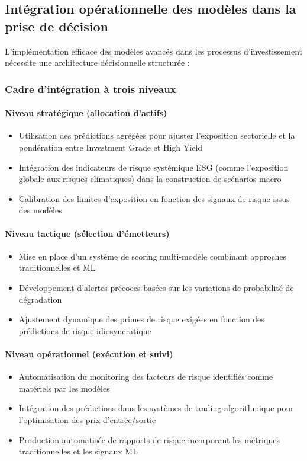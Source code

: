 \subsection{Intégration opérationnelle des modèles dans la prise de décision}

L'implémentation efficace des modèles avancés dans les processus d'investissement nécessite une architecture décisionnelle structurée :

\subsubsection{Cadre d'intégration à trois niveaux}

\paragraph{Niveau stratégique (allocation d'actifs)}
\begin{itemize}
  \item Utilisation des prédictions agrégées pour ajuster l'exposition sectorielle et la pondération entre Investment Grade et High Yield
  \item Intégration des indicateurs de risque systémique ESG (comme l'exposition globale aux risques climatiques) dans la construction de scénarios macro
  \item Calibration des limites d'exposition en fonction des signaux de risque issus des modèles
\end{itemize}

\paragraph{Niveau tactique (sélection d'émetteurs)}
\begin{itemize}
  \item Mise en place d'un système de scoring multi-modèle combinant approches traditionnelles et ML
  \item Développement d'alertes précoces basées sur les variations de probabilité de dégradation
  \item Ajustement dynamique des primes de risque exigées en fonction des prédictions de risque idiosyncratique
\end{itemize}

\paragraph{Niveau opérationnel (exécution et suivi)}
\begin{itemize}
  \item Automatisation du monitoring des facteurs de risque identifiés comme matériels par les modèles
  \item Intégration des prédictions dans les systèmes de trading algorithmique pour l'optimisation des prix d'entrée/sortie
  \item Production automatisée de rapports de risque incorporant les métriques traditionnelles et les signaux ML
\end{itemize}

